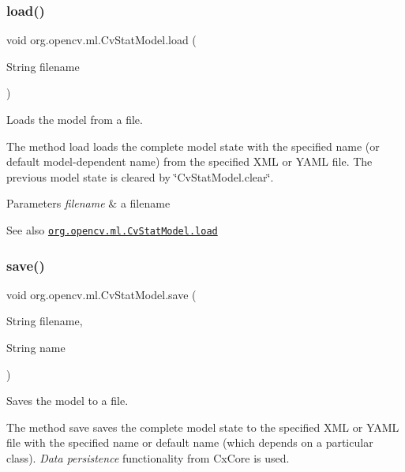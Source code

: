 \subsubsection{\texorpdfstring{load()}{load()}\hspace{0.1cm}{\footnotesize\ttfamily [2/2]}}
{\footnotesize\ttfamily void org.\+opencv.\+ml.\+Cv\+Stat\+Model.\+load (\begin{DoxyParamCaption}\item[{String}]{filename }\end{DoxyParamCaption})}

Loads the model from a file.

The method {\ttfamily load} loads the complete model state with the specified name (or default model-\/dependent name) from the specified X\+ML or Y\+A\+ML file. The previous model state is cleared by \char`\"{}\+Cv\+Stat\+Model.\+clear\char`\"{}.


\begin{DoxyParams}{Parameters}
{\em filename} & a filename\\
\hline
\end{DoxyParams}
\begin{DoxySeeAlso}{See also}
\href{http://docs.opencv.org/modules/ml/doc/statistical_models.html#cvstatmodel-load}{\tt org.\+opencv.\+ml.\+Cv\+Stat\+Model.\+load} 
\end{DoxySeeAlso}
\mbox{\label{classorg_1_1opencv_1_1ml_1_1_cv_stat_model_ae9d5b22ad37f528258cc5165af9f3f61}} 
\subsubsection{\texorpdfstring{save()}{save()}\hspace{0.1cm}{\footnotesize\ttfamily [1/2]}}
{\footnotesize\ttfamily void org.\+opencv.\+ml.\+Cv\+Stat\+Model.\+save (\begin{DoxyParamCaption}\item[{String}]{filename,  }\item[{String}]{name }\end{DoxyParamCaption})}

Saves the model to a file.

The method {\ttfamily save} saves the complete model state to the specified X\+ML or Y\+A\+ML file with the specified name or default name (which depends on a particular class). {\itshape Data persistence} functionality from {\ttfamily Cx\+Core} is used.


